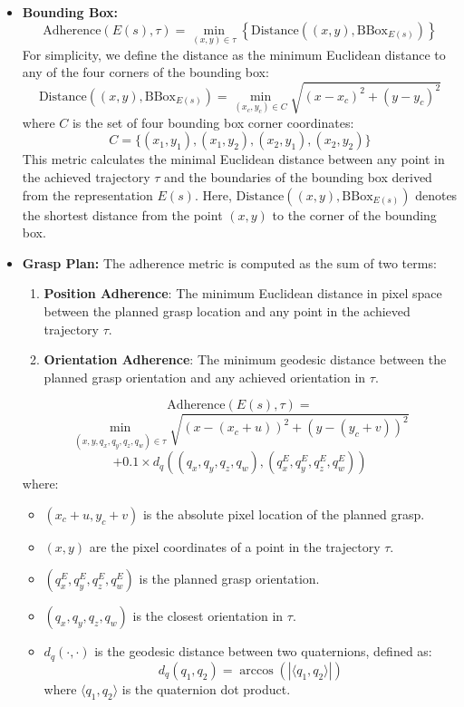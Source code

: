 \documentclass[conference,dvipsnames]{IEEEtran}
\begin{document}
\begin{itemize}
    \item \textbf{Bounding Box:} 
    $$\text{Adherence}(E(s), \tau) = \min_{(x, y) \in \tau} \left\{ \text{Distance}((x, y), \text{BBox}_{E(s)}) \right\}$$
    For simplicity, we define the distance as the minimum Euclidean distance to any of the four corners of the bounding box:
    $$
    \text{Distance}((x, y), \text{BBox}_{E(s)}) = \min_{(x_c, y_c) \in C} \sqrt{(x - x_c)^2 + (y - y_c)^2}
    $$
    where $ C $ is the set of four bounding box corner coordinates:
    $$C = \{(x_{1}, y_{1}), (x_{1}, y_{2}), (x_{2}, y_{1}), (x_{2}, y_{2})\}$$    
    This metric calculates the minimal Euclidean distance between any point in the achieved trajectory $\tau$ and the boundaries of the bounding box derived from the representation $E(s)$. Here, $\text{Distance}((x, y), \text{BBox}_{E(s)})$ denotes the shortest distance from the point $(x, y)$ to the corner of the bounding box.
    \item \textbf{Grasp Plan:} 
    The adherence metric is computed as the sum of two terms:
    \begin{enumerate}
        \item \textbf{Position Adherence}: The minimum Euclidean distance in pixel space between the planned grasp location and any point in the achieved trajectory $\tau$.
        \item \textbf{Orientation Adherence}: The minimum geodesic distance between the planned grasp orientation and any achieved orientation in $ \tau $.
    \end{enumerate}
    $$\text{Adherence}(E(s), \tau) = $$
    $$\min_{(x, y, q_x, q_y, q_z, q_w) \in \tau} 
    \sqrt{(x - (x_c + u))^2 + (y - (y_c + v))^2} $$
    $$+ 0.1 \times d_q((q_x, q_y, q_z, q_w), (q^E_x, q^E_y, q^E_z, q^E_w)) $$
    where:
    \begin{itemize}
    \item \( (x_c + u, y_c + v) \) is the absolute pixel location of the planned grasp.
    \item \( (x, y) \) are the pixel coordinates of a point in the trajectory \( \tau \).
    \item \( (q^E_x, q^E_y, q^E_z, q^E_w) \) is the planned grasp orientation.
    \item \( (q_x, q_y, q_z, q_w) \) is the closest orientation in \( \tau \).
    \item \( d_q(\cdot, \cdot) \) is the geodesic distance between two quaternions, defined as:
    $$
    d_q(q_1, q_2) = \arccos( | \langle q_1, q_2 \rangle | )
    $$
    where \( \langle q_1, q_2 \rangle \) is the quaternion dot product.
\end{itemize}



\end{itemize}
\end{document}
